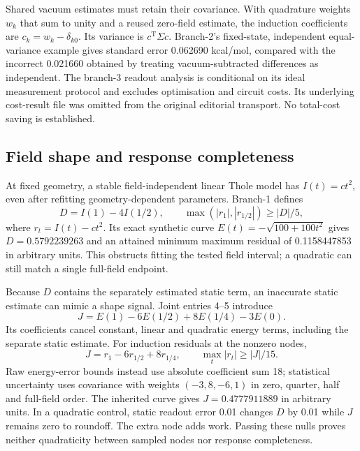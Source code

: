 \documentclass{article}
\begin{document}
Shared vacuum estimates must retain their covariance. With quadrature weights $w_k$ that sum to unity and a reused zero-field estimate, the induction coefficients are $c_k=w_k-\delta_{k0}$. Its variance is $c^{\mathrm T}\Sigma c$. Branch-2's fixed-state, independent equal-variance example gives standard error 0.062690 kcal/mol, compared with the incorrect 0.021660 obtained by treating vacuum-subtracted differences as independent. The branch-3 readout analysis is conditional on its ideal measurement protocol and excludes optimisation and circuit costs. Its underlying cost-result file was omitted from the original editorial transport. No total-cost saving is established.

\subsection{Field shape and response completeness}

At fixed geometry, a stable field-independent linear Thole model has $I(t)=ct^2$, even after refitting geometry-dependent parameters. Branch-1 defines
\begin{equation*}
D=I(1)-4I(1/2),\qquad
\max(|r_1|,|r_{1/2}|)\geq |D|/5,
\end{equation*}
where $r_t=I(t)-ct^2$. Its exact synthetic curve $E(t)=-\sqrt{100+100t^2}$ gives $D=0.5792239263$ and an attained minimum maximum residual of 0.1158447853 in arbitrary units. This obstructs fitting the tested field interval; a quadratic can still match a single full-field endpoint.

Because $D$ contains the separately estimated static term, an inaccurate static estimate can mimic a shape signal. Joint entries 4--5 introduce
\begin{equation*}
J=E(1)-6E(1/2)+8E(1/4)-3E(0).
\end{equation*}
Its coefficients cancel constant, linear and quadratic energy terms, including the separate static estimate. For induction residuals at the nonzero nodes,
\begin{equation*}
J=r_1-6r_{1/2}+8r_{1/4},\qquad \max_t|r_t|\geq |J|/15.
\end{equation*}
Raw energy-error bounds instead use absolute coefficient sum 18; statistical uncertainty uses covariance with weights $(-3,8,-6,1)$ in zero, quarter, half and full-field order. The inherited curve gives $J=0.4777911889$ in arbitrary units. In a quadratic control, static readout error 0.01 changes $D$ by 0.01 while $J$ remains zero to roundoff. The extra node adds work. Passing these nulls proves neither quadraticity between sampled nodes nor response completeness.
\end{document}
